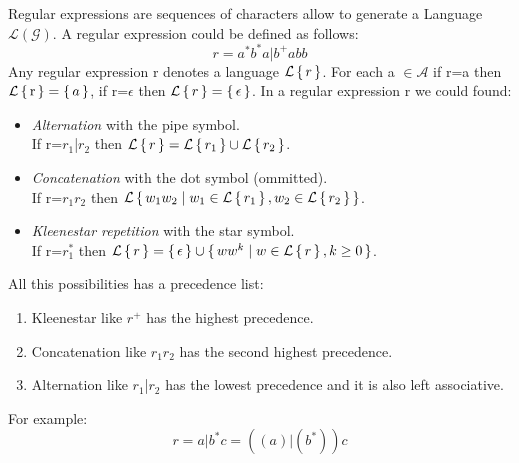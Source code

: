Regular expressions are sequences of characters allow to generate a Language $\mathcal{L(G)}$. A regular expression could be defined as follows:
\begin{equation}
r = a^*b^*a|b^+abb
\end{equation}
Any regular expression r denotes a language $\mathcal{L}\set{r}$.
For each a $\in\mathcal{A}$ if r=a then $\mathcal{L}\set{\text{r}}=\set{a}$, if r=$\epsilon$ then $\mathcal{L}\set{r}=\set{\epsilon}$. In a regular expression r we could found:

\begin{itemize}
\item \textit{Alternation} with the pipe symbol. \\ If r=$r_1$|$r_2$ then $\mathcal{L}\set{r} = \mathcal{L}\set{r_1} \cup \mathcal{L}\set{r_2}$.
\item \textit{Concatenation} with the dot symbol (ommitted). \\ If r=$r_1r_2$ then $\mathcal{L}\set{w_1w_2 | w_1 \in \mathcal{L}\set{r_1}, w_2 \in \mathcal{L}\set{r_2}}$.
\item \textit{Kleenestar repetition} with the star symbol. \\ If r=$r_1^*$ then $\mathcal{L}\set{r}=\set{\epsilon} \cup \set{ww^k | w \in \mathcal{L}\set{r}, k \geq 0}$.
\end{itemize}
All this possibilities has a precedence list:
\begin{enumerate}
\item Kleenestar like $r^+$ has the highest precedence.
\item Concatenation like $r_1r_2$ has the second highest precedence.
\item Alternation like $r_1$|$r_2$ has the lowest precedence and it is also left associative.
\end{enumerate}
For example:
\begin{equation}
r = a|b^*c = ((a)|(b^*))c
\end{equation}



